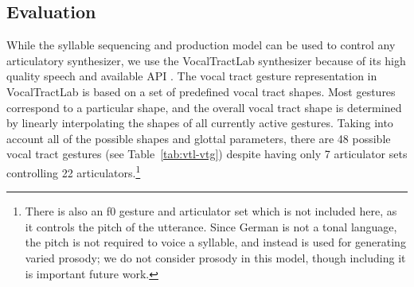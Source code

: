 \subsection{Evaluation}

While the syllable sequencing and production model
can be used to control any articulatory synthesizer,
we use the VocalTractLab synthesizer
because of its high quality speech
and available API \citep{birkholz2013}.
The vocal tract gesture representation
in VocalTractLab is based on a set of
predefined vocal tract shapes.
Most gestures correspond to
a particular shape,
and the overall vocal tract shape
is determined by linearly interpolating
the shapes of all currently active gestures.
Taking into account all of the
possible shapes and glottal parameters,
there are 48 possible vocal tract gestures
(see Table~\ref{tab:vtl-vtg}) despite having only
7 articulator sets
controlling 22 articulators.\footnote{
  There is also an f0 gesture and articulator set
  which is not included here,
  as it controls the pitch of the utterance.
  Since German is not a tonal language,
  the pitch is not required to voice a syllable,
  and instead is used for generating
  varied prosody;
  we do not consider prosody in this model,
  though including it is important future work.}

